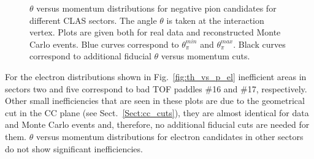 \begin{figure}[htp]
\begin{center}
\caption{\small $\theta$ versus momentum distributions for negative pion candidates for different CLAS sectors. The angle $\theta$ is taken at the interaction vertex. Plots are given both for real data and reconstructed Monte Carlo events. Blue curves correspond to $\theta_{\pi}^{min}$ and $\theta_{\pi}^{max}$. Black curves correspond to additional fiducial $\theta$ versus momentum cuts. \label{fig:th_vs_p_pim}}
\end{center}
\end{figure}
\clearpage

For the electron distributions shown in Fig.~\ref{fig:th_vs_p_el} inefficient areas in sectors two and five correspond to bad TOF paddles \#16 and \#17, respectively. Other small inefficiencies that are seen in these plots are due to the geometrical cut in the CC plane (see Sect.~\ref{Sect:cc_cuts}), they are almost identical for data and Monte Carlo events and, therefore, no additional fiducial cuts are needed for them.  $\theta$ versus momentum distributions for electron candidates in other sectors do not show significant inefficiencies. 

